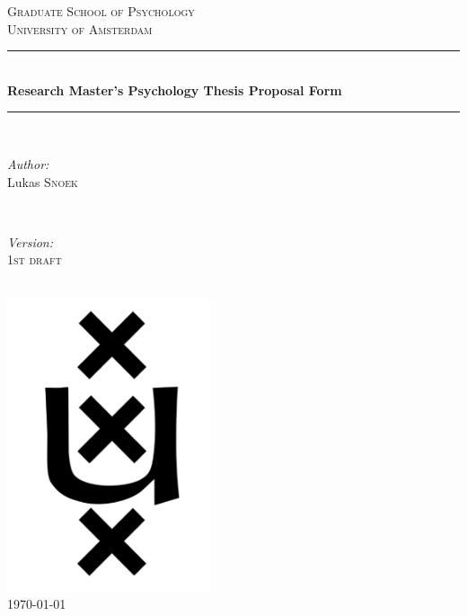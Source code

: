 \documentclass[12pt,a4paper]{article}\usepackage[]{graphicx}\usepackage[]{color}
\begin{document}
\begin{titlepage}

\newcommand{\HRule}{\rule{\linewidth}{0.5mm}} 
\center 

\textsc{\LARGE Graduate School of Psychology}\\[1cm] 
\textsc{\Large University of Amsterdam}\\[1cm]

\HRule \\[0.4cm]
{ \huge \bfseries Research Master's Psychology Thesis Proposal Form}\\[0.4cm] 
\HRule \\[1.5cm]
 
\begin{minipage}{0.4\textwidth}
\begin{flushleft} \large
\emph{Author:}\\
Lukas \textsc{Snoek} 
\end{flushleft}
\end{minipage}
~
\begin{minipage}{0.4\textwidth}
\begin{flushright} \large
\emph{Version:} \\
\textsc{1st draft} 
\end{flushright}
\end{minipage}\\[1cm]

\includegraphics[width=60mm]{uva_logo_inv}\\[1cm] 

{\large \today}\\[2cm]

\vfill 

\end{titlepage}
\end{document}
